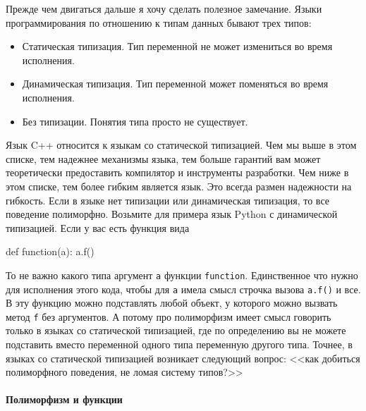 Прежде чем двигаться дальше я хочу сделать полезное замечание.
Языки программирования по отношению к типам данных бывают трех типов:
\begin{itemize}
\item Статическая типизация.
Тип переменной не может измениться во время исполнения.

\item Динамическая типизация.
Тип переменной может поменяться во время исполнения.

\item Без типизации.
Понятия типа просто не существует.
\end{itemize}
Язык C++ относится к языкам со статической типизацией.
Чем мы выше в этом списке, тем надежнее механизмы языка, тем больше гарантий вам может теоретически предоставить компилятор и инструменты разработки.
Чем ниже в этом списке, тем более гибким является язык.
Это всегда размен надежности на гибкость.
Если в языке нет типизации или динамическая типизация, то все поведение полиморфно.
Возьмите для примера язык Python с динамической типизацией.
Если у вас есть функция вида
\begin{pythoncode}
def function(a):
  a.f()
\end{pythoncode}
То не важно какого типа аргумент \texttt{a} функции \texttt{function}.
Единственное что нужно для исполнения этого кода, чтобы для \texttt{a} имела смысл строчка вызова \texttt{a.f()} и все.
В эту функцию можно подставлять любой объект, у которого можно вызвать метод \texttt{f} без аргументов.
А потому про полиморфизм имеет смысл говорить только в языках со статической типизацией, где по определению вы не можете подставить вместо переменной одного типа переменную другого типа.
Точнее, в языках со статической типизацией возникает следующий вопрос: <<как добиться полиморфного поведения, не ломая систему типов?>>

\paragraph{Полиморфизм и функции}

